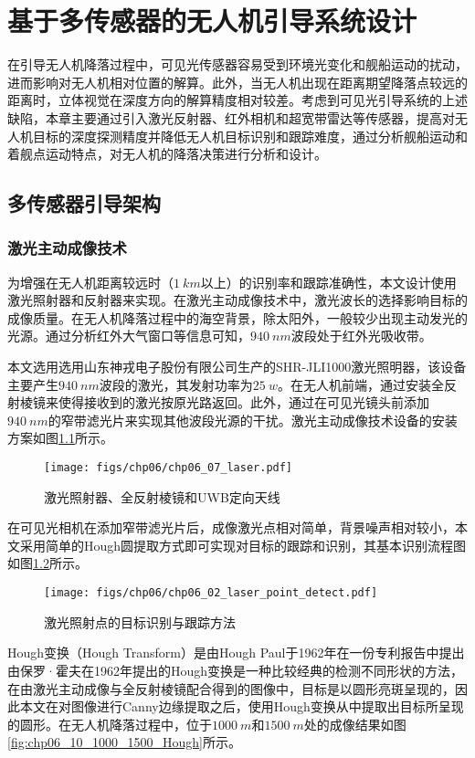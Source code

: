 \chapter{基于多传感器的无人机引导系统设计}
在引导无人机降落过程中，可见光传感器容易受到环境光变化和舰船运动的扰动，进而影响对无人机相对位置的解算。此外，当无人机出现在距离期望降落点较远的距离时，立体视觉在深度方向的解算精度相对较差。考虑到可见光引导系统的上述缺陷，本章主要通过引入激光反射器、红外相机和超宽带雷达等传感器，提高对无人机目标的深度探测精度并降低无人机目标识别和跟踪难度，通过分析舰船运动和着舰点运动特点，对无人机的降落决策进行分析和设计。

\section{多传感器引导架构}
\subsection{激光主动成像技术}
为增强在无人机距离较远时（$1\ km$以上）的识别率和跟踪准确性，本文设计使用激光照射器和反射器来实现。在激光主动成像技术中，激光波长的选择影响目标的成像质量。在无人机降落过程中的海空背景，除太阳外，一般较少出现主动发光的光源。通过分析红外大气窗口等信息可知，$940\ nm$波段处于红外光吸收带。

本文选用选用山东神戎电子股份有限公司生产的SHR-JLI1000激光照明器，该设备主要产生$940\ nm$波段的激光，其发射功率为$25\ w$。在无人机前端，通过安装全反射棱镜来使得接收到的激光按原光路返回。此外，通过在可见光镜头前添加$940\ nm$的窄带滤光片来实现其他波段光源的干扰。激光主动成像技术设备的安装方案如图\ref{fig:chp06_07_laser}所示。

\begin{figure}[!h]
	\centering
	\texttt{[image: figs/chp06/chp06\_07\_laser.pdf]}	
	\caption{激光照射器、全反射棱镜和UWB定向天线}
	\label{fig:chp06_07_laser}
\end{figure}

在可见光相机在添加窄带滤光片后，成像激光点相对简单，背景噪声相对较小，本文采用简单的Hough圆提取方式即可实现对目标的跟踪和识别，其基本识别流程图如图\ref{fig:chp06_02_laser_point_detect}所示。

\begin{figure}[!t]
	\centering
	\texttt{[image: figs/chp06/chp06\_02\_laser\_point\_detect.pdf]}	
	\caption{激光照射点的目标识别与跟踪方法}
	\label{fig:chp06_02_laser_point_detect}
\end{figure}

Hough变换（Hough Transform）是由Hough Paul于1962年在一份专利报告中提出\cite{vc1962method}
由保罗·霍夫在1962年提出的Hough变换是一种比较经典的检测不同形状的方法，在由激光主动成像与全反射棱镜配合得到的图像中，目标是以圆形亮斑呈现的，因此本文在对图像进行Canny边缘提取之后，使用Hough变换从中提取出目标所呈现的圆形。在无人机降落过程中，位于$1000\ m$和$1500\ m$处的成像结果如图\ref{fig:chp06_10_1000_1500_Hough}所示。

